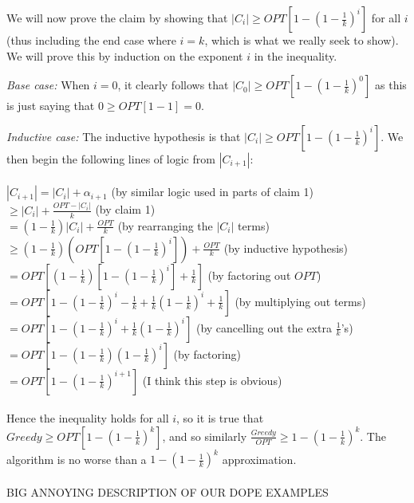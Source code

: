 \documentclass{article}
\begin{document}
We will now prove the claim by showing that $|C_i| \ge OPT[1-(1-\frac{1}{k})^i]$ for all $i$ (thus including the end case where $i=k$, which is what we really seek to show). We will prove this by induction on the exponent $i$ in the inequality.

\textit{Base case: } When $i=0$, it clearly follows that $|C_0| \ge OPT[1-(1-\frac{1}{k})^0]$ as this is just saying that $0 \ge OPT[1-1] = 0$.

\textit{Inductive case: } The inductive hypothesis is that $|C_i| \ge OPT[1-(1-\frac{1}{k})^i]$. We then begin the following lines of logic from $|C_{i+1}|$:
\\
\\
$|C_{i+1}| = |C_i| + \alpha_{i+1}$ \indent (by similar logic used in parts of claim 1)
\\
$\ge |C_i|+\frac{OPT-|C_i|}{k}$ \indent (by claim 1)
\\
$=(1-\frac{1}{k})|C_i| + \frac{OPT}{k}$ \indent (by rearranging the $|C_i|$ terms)
\\
$\ge (1-\frac{1}{k})(OPT[1-(1-\frac{1}{k})^i]) + \frac{OPT}{k}$ \indent (by inductive hypothesis)
\\
$= OPT[(1-\frac{1}{k})[1-(1-\frac{1}{k})^i] + \frac{1}{k}]$ \indent (by factoring out $OPT$)
\\
$= OPT[1 - (1-\frac{1}{k})^i-\frac{1}{k}+\frac{1}{k}(1-\frac{1}{k})^i+\frac{1}{k}]$ \indent (by multiplying out terms)
\\
$= OPT[1-(1-\frac{1}{k})^i + \frac{1}{k}(1-\frac{1}{k})^i]$ \indent (by cancelling out the extra $\frac{1}{k}$'s)
\\
$= OPT[1-(1-\frac{1}{k})(1-\frac{1}{k})^i]$ \indent (by factoring)
\\
$= OPT[1-(1-\frac{1}{k})^{i+1}]$ \indent (I think this step is obvious)
\\
\\
Hence the inequality holds for all $i$, so it is true that $Greedy \ge OPT[1-(1-\frac{1}{k})^k]$, and so similarly $\frac{Greedy}{OPT} \ge 1-(1-\frac{1}{k})^k$. The algorithm is no worse than a $1-(1-\frac{1}{k})^k$ approximation. 
\\
\\
BIG ANNOYING DESCRIPTION OF OUR DOPE EXAMPLES
\end{document}
